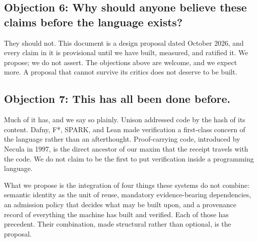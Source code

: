 \documentclass[11pt]{article}
\begin{document}
\subsection*{Objection 6: Why should anyone believe these claims before the language exists?}

They should not. This document is a design proposal dated October 2026,
and every claim in it is provisional until we have built, measured, and
ratified it. We propose; we do not assert. The objections above are
welcome, and we expect more. A proposal that cannot survive its critics
does not deserve to be built.

\subsection*{Objection 7: This has all been done before.}

Much of it has, and we say so plainly. Unison addressed code by the hash
of its content. Dafny, F*, SPARK, and Lean made verification a
first-class concern of the language rather than an afterthought.
Proof-carrying code, introduced by Necula in 1997, is the direct ancestor
of our maxim that the receipt travels with the code. We do not claim to
be the first to put verification inside a programming language.

What we propose is the integration of four things these systems do not
combine: semantic identity as the unit of reuse, mandatory
evidence-bearing dependencies, an admission policy that decides what may
be built upon, and a provenance record of everything the machine has built
and verified. Each of those has precedent. Their combination, made
structural rather than optional, is the proposal.
\end{document}
